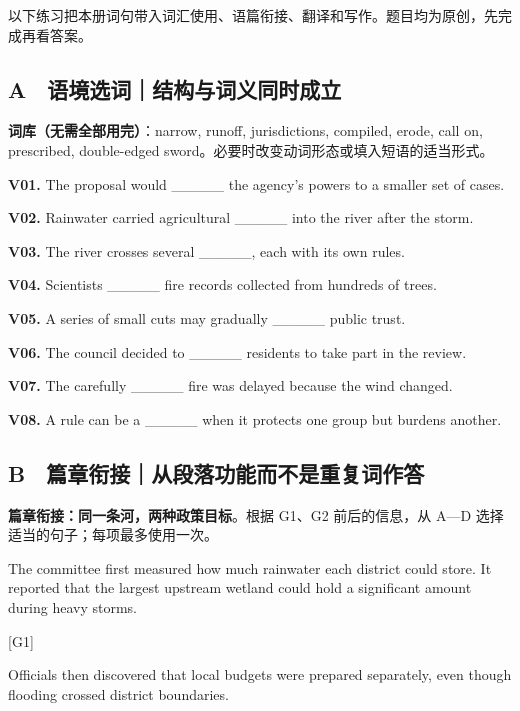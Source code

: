 \documentclass[
  11pt,
]{ctexart}
\begin{document}
以下练习把本册词句带入词汇使用、语篇衔接、翻译和写作。题目均为原创，先完成再看答案。

\subsection{A　语境选词｜结构与词义同时成立}\label{a-ux8bedux5883ux9009ux8bcdux7ed3ux6784ux4e0eux8bcdux4e49ux540cux65f6ux6210ux7acb}

\textbf{词库（无需全部用完）}：narrow, runoff, jurisdictions, compiled,
erode, call on, prescribed, double-edged
sword。必要时改变动词形态或填入短语的适当形式。

\textbf{V01.} The proposal would \_\_\_\_\_ the agency's powers to a
smaller set of cases.

\textbf{V02.} Rainwater carried agricultural \_\_\_\_\_ into the river
after the storm.

\textbf{V03.} The river crosses several \_\_\_\_\_, each with its own
rules.

\textbf{V04.} Scientists \_\_\_\_\_ fire records collected from hundreds
of trees.

\textbf{V05.} A series of small cuts may gradually \_\_\_\_\_ public
trust.

\textbf{V06.} The council decided to \_\_\_\_\_ residents to take part
in the review.

\textbf{V07.} The carefully \_\_\_\_\_ fire was delayed because the wind
changed.

\textbf{V08.} A rule can be a \_\_\_\_\_ when it protects one group but
burdens another.

\subsection{B　篇章衔接｜从段落功能而不是重复词作答}\label{b-ux7bc7ux7ae0ux8854ux63a5ux4eceux6bb5ux843dux529fux80fdux800cux4e0dux662fux91cdux590dux8bcdux4f5cux7b54}

\textbf{篇章衔接：同一条河，两种政策目标}。根据 G1、G2 前后的信息，从
A---D 选择适当的句子；每项最多使用一次。

The committee first measured how much rainwater each district could
store. It reported that the largest upstream wetland could hold a
significant amount during heavy storms.

{[}G1{]}

Officials then discovered that local budgets were prepared separately,
even though flooding crossed district boundaries.
\end{document}
